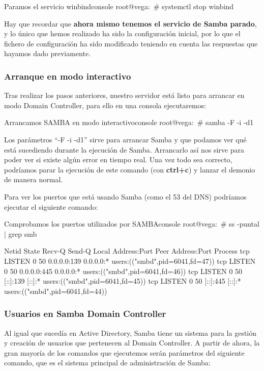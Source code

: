 \documentclass{../../../yukibook.cls/yukibook}
\begin{document}
\begin{mycode}{Paramos el servicio winbind}{console}{}
root@vega:~# systemctl stop winbind
\end{mycode}

Hay que recordar que \textbf{ahora mismo tenemos el servicio de Samba parado}, y lo único que hemos realizado ha sido la configuración inicial, por lo que el fichero de configuración    ha sido modificado teniendo en cuenta las respuestas que hayamos dado previamente.

\subsubsection{Arranque en modo interactivo}
Tras realizar los pasos anteriores, nuestro servidor está listo para arrancar en modo Domain Controller, para ello en una consola ejecutaremos:

\begin{mycode}{Arrancamos SAMBA en modo interactivo}{console}{}
root@vega:~# samba -F -i -d1
\end{mycode}

Los parámetros “-F -i -d1” sirve para arrancar Samba y que podamos ver qué está sucediendo durante la ejecución de Samba. Arrancarlo así nos sirve para poder ver si existe algún error en tiempo real. Una vez todo sea correcto, podríamos parar la ejecución de este comando (con \textbf{ctrl+c}) y lanzar el demonio de manera normal.

Para ver los puertos que está usando Samba (como el 53 del DNS) podríamos ejecutar el siguiente comando:

\begin{mycode}{Comprobamos los puertos utilizados por SAMBA}{console}{\fontsize{7.6pt}{7pt}}
root@vega:~# ss -puntal | grep smb

Netid  State   Recv-Q  Send-Q    Local Address:Port    Peer Address:Port  Process
tcp    LISTEN  0       50        0.0.0.0:139          0.0.0.0:*      users:(("smbd",pid=6041,fd=47))
tcp    LISTEN  0       50        0.0.0.0:445          0.0.0.0:*      users:(("smbd",pid=6041,fd=46))
tcp    LISTEN  0       50        [::]:139             [::]:*          users:(("smbd",pid=6041,fd=45))
tcp    LISTEN  0       50        [::]:445             [::]:*          users:(("smbd",pid=6041,fd=44))
\end{mycode}

\subsubsection{Usuarios en Samba Domain Controller}
Al igual que sucedía en Active Directory, Samba tiene un sistema para la gestión y creación de usuarios que pertenecen al Domain Controller. A partir de ahora, la gran mayoría de los comandos que ejecutemos serán parámetros del siguiente comando, que es el sistema principal de administración de Samba:
\end{document}
